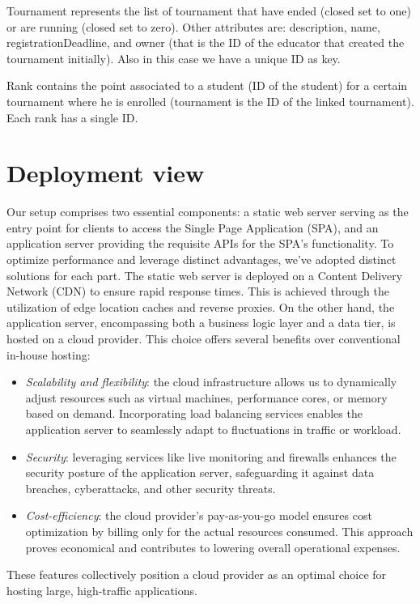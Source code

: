 \documentclass[12pt, a4paper]{report}
\begin{document}
    Tournament represents the list of tournament that have ended (closed set to one) or are running (closed set to zero). 
    Other attributes are: description, name, registrationDeadline, and owner (that is the ID of the educator that created the tournament initially). 
    Also in this case we have a unique ID as key. 

    Rank contains the point associated to a student (ID of the student) for a certain tournament where he is enrolled (tournament is the ID of the linked tournament). 
    Each rank has a single ID. 


    \section{Deployment view}
    Our setup comprises two essential components: a static web server serving as the entry point for clients to access the Single Page Application (SPA), and an application server providing the requisite APIs for the SPA's functionality. 
    To optimize performance and leverage distinct advantages, we've adopted distinct solutions for each part.
    The static web server is deployed on a Content Delivery Network (CDN) to ensure rapid response times. 
    This is achieved through the utilization of edge location caches and reverse proxies. 
    On the other hand, the application server, encompassing both a business logic layer and a data tier, is hosted on a cloud provider. 
    This choice offers several benefits over conventional in-house hosting:
    \begin{itemize}
        \item \textit{Scalability and flexibility}: the cloud infrastructure allows us to dynamically adjust resources such as virtual machines, performance cores, or memory based on demand. Incorporating load balancing services enables the application server to seamlessly adapt to fluctuations in traffic or workload.
        \item \textit{Security}: leveraging services like live monitoring and firewalls enhances the security posture of the application server, safeguarding it against data breaches, cyberattacks, and other security threats.
        \item \textit{Cost-efficiency}: the cloud provider's pay-as-you-go model ensures cost optimization by billing only for the actual resources consumed. This approach proves economical and contributes to lowering overall operational expenses.
    \end{itemize}
    These features collectively position a cloud provider as an optimal choice for hosting large, high-traffic applications. 
\end{document}
